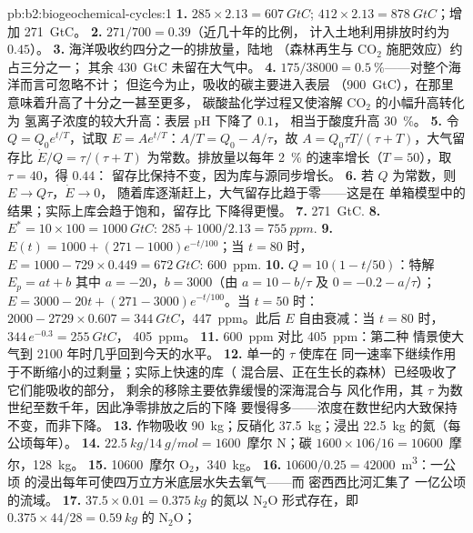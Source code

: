 \begin{solution}{pb:b2:biogeochemical-cycles:1}
\textbf{1.} $285\times 2.13 = \qty{607}{GtC}$; $412\times 2.13 =
\qty{878}{GtC}$；增加 \qty{271}{GtC}。
\textbf{2.} $271/700 = 0.39$（近几十年的比例，
计入土地利用排放时约为 $0.45$）。
\textbf{3.} 海洋吸收约四分之一的排放量，陆地
（森林再生与 $\mathrm{CO_2}$ 施肥效应）约占三分之一；
其余 \qty{430}{GtC} 未留在大气中。
\textbf{4.} $175/38000 = \qty{0.5}{\%}$——对整个海洋而言可忽略不计；
但迄今为止，吸收的碳主要进入表层
（\qty{900}{GtC}），在那里意味着升高了十分之一甚至更多，
碳酸盐化学过程又使溶解 $\mathrm{CO_2}$ 的小幅升高转化为
氢离子浓度的较大升高：表层 pH 下降了 $0.1$，
相当于酸度升高 \qty{30}{\%}。
\textbf{5.} 令 $Q = Q_0 e^{t/T}$，试取 $E = Ae^{t/T}$：$A/T = Q_0 -
A/\tau$，故 $A = Q_0\tau T/(\tau + T)$，大气留存比
$\dot E/Q = \tau/(\tau + T)$ 为常数。排放量以每年
\qty{2}{\%} 的速率增长（$T = 50$），取 $\tau = 40$，得 $0.44$：
留存比保持不变，因为库与源同步增长。
\textbf{6.} 若 $Q$ 为常数，则 $E \to Q\tau$，$\dot E \to 0$，
随着库逐渐赶上，大气留存比趋于零——这是在
单箱模型中的结果；实际上库会趋于饱和，留存比
下降得更慢。
\textbf{7.} \qty{271}{GtC}.
\textbf{8.} $E^{*} = 10\times 100 = \qty{1000}{GtC}$: $285 +
1000/2.13 = \qty{755}{ppm}$.
\textbf{9.} $E(t) = 1000 + (271 - 1000)e^{-t/100}$；当 $t = 80$ 时，
$E = 1000 - 729\times 0.449 = \qty{672}{GtC}$: \qty{600}{ppm}.
\textbf{10.} $Q = 10(1 - t/50)$：特解 $E_p = at + b$
其中 $a = -20$，$b = 3000$（由 $a = 10 - b/\tau$ 及 $0 = -0.2 -
a/\tau$）；$E = 3000 - 20t + (271 - 3000)e^{-t/100}$。当 $t = 50$ 时：
$2000 - 2729\times 0.607 = \qty{344}{GtC}$，\qty{447}{ppm}。此后 $E$
自由衰减：当 $t = 80$ 时，$344\,e^{-0.3} = \qty{255}{GtC}$，
\qty{405}{ppm}。
\textbf{11.} \qty{600}{ppm} 对比 \qty{405}{ppm}：第二种
情景使大气到 2100 年时几乎回到今天的水平。
\textbf{12.} 单一的 $\tau$ 使库在
同一速率下继续作用于不断缩小的过剩量；实际上快速的库（
混合层、正在生长的森林）已经吸收了它们能吸收的部分，
剩余的移除主要依靠缓慢的深海混合与
风化作用，其 $\tau$ 为数世纪至数千年，因此净零排放之后的下降
要慢得多——浓度在数世纪内大致保持
不变，而非下降。
\textbf{13.} 作物吸收 \qty{90}{kg}；反硝化 \qty{37.5}{kg}；浸出
\qty{22.5}{kg} 的氮（每公顷每年）。
\textbf{14.} $\qty{22.5}{kg}/\qty{14}{g/mol} = 1600$~摩尔 N；碳 
$1600\times 106/16 = \num{10600}$~摩尔，\qty{128}{kg}。
\textbf{15.} \num{10600}~摩尔 $\mathrm{O_2}$，\qty{340}{kg}。
\textbf{16.} $\num{10600}/0.25 = \num{42000}$~\unit{m^3}：一公顷
的浸出每年可使四万立方米底层水失去氧气——而
密西西比河汇集了
一亿公顷的流域。
\textbf{17.} $37.5\times 0.01 = \qty{0.375}{kg}$ 的氮以
$\mathrm{N_2O}$ 形式存在，即 $0.375\times 44/28 = \qty{0.59}{kg}$ 的 $\mathrm{N_2O}$；

\end{solution}
